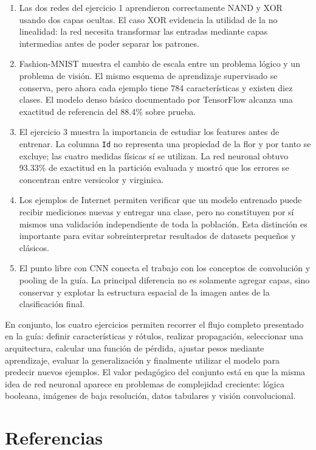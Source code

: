 \documentclass[14pt,twoside]{article}
\begin{document}
\begin{enumerate}[leftmargin=1.2cm]
    \item Las dos redes del ejercicio 1 aprendieron correctamente NAND y XOR usando dos capas ocultas. El caso XOR evidencia la utilidad de la no linealidad: la red necesita transformar las entradas mediante capas intermedias antes de poder separar los patrones.
    \item Fashion-MNIST muestra el cambio de escala entre un problema lógico y un problema de visión. El mismo esquema de aprendizaje supervisado se conserva, pero ahora cada ejemplo tiene 784 características y existen diez clases. El modelo denso básico documentado por TensorFlow alcanza una exactitud de referencia del 88.4\% sobre prueba. \cite{tensorflowfashion}
    \item El ejercicio 3 muestra la importancia de estudiar los features antes de entrenar. La columna \texttt{Id} no representa una propiedad de la flor y por tanto se excluye; las cuatro medidas físicas sí se utilizan. La red neuronal obtuvo 93.33\% de exactitud en la partición evaluada y mostró que los errores se concentran entre versicolor y virginica.
    \item Los ejemplos de Internet permiten verificar que un modelo entrenado puede recibir mediciones nuevas y entregar una clase, pero no constituyen por sí mismos una validación independiente de toda la población. Esta distinción es importante para evitar sobreinterpretar resultados de datasets pequeños y clásicos.
    \item El punto libre con CNN conecta el trabajo con los conceptos de convolución y pooling de la guía. La principal diferencia no es solamente agregar capas, sino conservar y explotar la estructura espacial de la imagen antes de la clasificación final. \cite{martinez2026}
\end{enumerate}

En conjunto, los cuatro ejercicios permiten recorrer el flujo completo presentado en la guía: definir características y rótulos, realizar propagación, seleccionar una arquitectura, calcular una función de pérdida, ajustar pesos mediante aprendizaje, evaluar la generalización y finalmente utilizar el modelo para predecir nuevos ejemplos. El valor pedagógico del conjunto está en que la misma idea de red neuronal aparece en problemas de complejidad creciente: lógica booleana, imágenes de baja resolución, datos tabulares y visión convolucional.

\section{Referencias}
\end{document}
